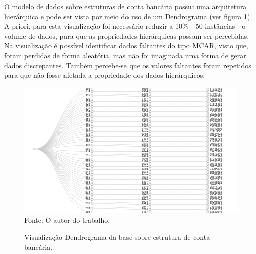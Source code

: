 \documentclass[
	12pt,				%
	openright,			%
	oneside,			%
	a4paper,			%
	english,			%
	brazil				%
	]{abntex2}
\begin{document}



	O modelo de dados sobre estruturas de conta bancária possui uma arquitetura hierárquica e pode ser vista por meio do uso de um Dendrograma (ver figura \ref{fig:BancoDendrograma}).
	A priori, para esta visualização foi necessário reduzir a 10\% - 50 instâncias - o volume de dados, para que as propriedades hierárquicas possam ser percebidas.
	Na visualização é possível identificar dados faltantes do tipo MCAR, visto que, foram perdidas de forma aleatória, mas não foi imaginada uma forma de gerar dados discrepantes.
	Também percebe-se que os valores faltantes foram repetidos para que não fosse afetada a propriedade dos dados hierárquicos.
	\par
	\begin{figure}[h!]
		\centering
		\caption{Visualização Dendrograma da base sobre estrutura de conta bancária.}
		\includegraphics[width=\linewidth]{./figures/Resultados/BancoDendrograma.png}
		\label{fig:BancoDendrograma}
		\footnotesize Fonte: O autor do trabalho.
	\end{figure}
\end{document}
